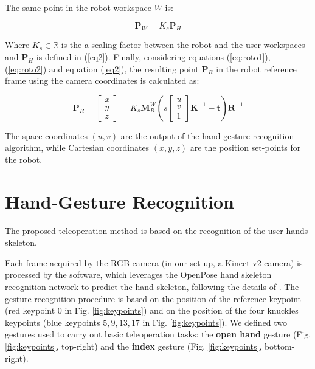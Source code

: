 \documentclass[a4paper, 10 pt, conference]{ieeeconf}      %
\begin{document}
The same point in the robot workspace $W$ is:

\begin{equation}\label{eq:roto2}
\mathbf{P}_{W} = K_s\mathbf{P}_{H}
\end{equation}

Where $K_s\in \mathbb{R}$ is the a scaling factor between the robot and the user workspaces and $\mathbf{P}_{H}$ is defined in (\ref{eq2}). Finally, considering equations (\ref{eq:roto1}),(\ref{eq:roto2}) and equation (\ref{eq2}), the resulting point $\mathbf{P}_R$ in the robot reference frame using the camera coordinates is calculated as:

\begin{equation}
\mathbf{P}_{R} = \begin{bmatrix}
x \\
y \\
z
\end{bmatrix}=
K_s\mathbf{M}^W_{R}
\left(s 
\begin{bmatrix}
u \\
v \\
1
\end{bmatrix}
\mathbf{K}^{-1}-\mathbf{t}\right)\mathbf{R}^{-1}
\end{equation}

The space coordinates $(u,v)$ are the output of the hand-gesture recognition algorithm, while Cartesian coordinates $(x,y,z)$ are the position set-points for the robot.

\section{Hand-Gesture Recognition}\label{sec:HG_recon}

The proposed teleoperation method is based on the recognition of the user hands skeleton.

Each frame acquired by the RGB camera (in our set-up, a Kinect v2 camera) is processed by the software, which leverages the OpenPose hand skeleton recognition network to predict the hand skeleton, following the details of \cite{simon2017hand}.
The gesture recognition procedure is based on the position of the reference keypoint (red keypoint $0$ in Fig. \ref{fig:keypoints}) and on the position of the four knuckles keypoints (blue keypoints $5, 9, 13, 17$ in Fig. \ref{fig:keypoints}). We defined two gestures used to carry out basic teleoperation tasks: the \textbf{open hand} gesture (Fig. \ref{fig:keypoints}, top-right) and the \textbf{index} gesture (Fig. \ref{fig:keypoints}, bottom-right).
\end{document}
